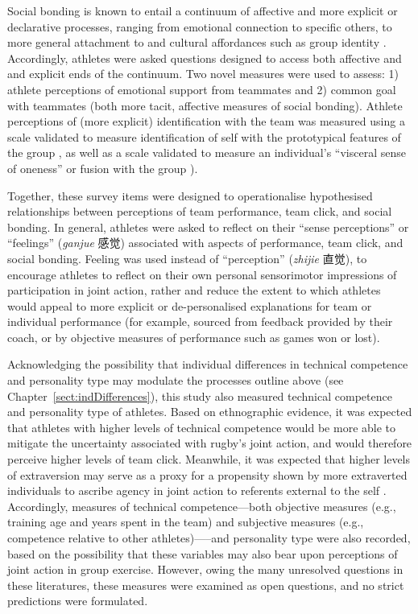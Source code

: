 \begin{CJK}{UTF8}{gbsn}
Social bonding is known to entail a continuum of affective and more explicit or declarative processes, ranging from emotional connection to specific others, to more general attachment to and cultural affordances such as group identity \citep{Dunbar2010,Whitehouse2014}.  Accordingly, athletes were asked questions designed to  access both affective and and explicit ends of the continuum.  Two novel measures were used to assess: 1) athlete perceptions of emotional support from teammates and 2) common goal with teammates (both more tacit, affective measures of social bonding).  Athlete perceptions of (more explicit) identification with the team was measured using a scale validated to measure identification of self with the prototypical features of the group \citep[Group Identification, see][]{Turner1987}, as well as a scale validated to measure an individual's ``visceral sense of oneness'' or fusion with the group \citep[Identity Fusion; see][]{Swann2009}).

Together, these survey items were designed to operationalise hypothesised relationships between perceptions of team performance, team click, and social bonding.  In general, athletes were asked to reflect on their ``sense perceptions'' or ``feelings'' (\textit{ganjue} 感觉) associated with aspects of performance, team click, and social bonding.  Feeling was used instead of ``perception'' (\textit{zhijie} 直觉), to encourage athletes to reflect on their own personal sensorimotor impressions of participation in joint action, rather and reduce the extent to which athletes would appeal to more explicit or de-personalised explanations for team or individual performance (for example, sourced from feedback provided by their coach, or by objective measures of performance such as games won or lost).

Acknowledging the possibility that individual differences in technical competence and personality type may modulate the processes outline above (see Chapter~\ref{sect:indDifferences}), this study also measured technical competence and personality type of athletes.  Based on ethnographic evidence, it was expected that athletes with higher levels of technical competence would be more able to mitigate the uncertainty associated with rugby’s joint action, and would therefore perceive higher levels of team click.  Meanwhile, it was expected that higher levels of extraversion may serve as a proxy for a propensity shown by more extraverted individuals to ascribe agency in joint action to referents external to the self \citep[]{Keller2014}.  Accordingly, measures of technical competence---both objective measures (e.g., training age and years spent in the team) and subjective measures (e.g., competence relative to other athletes)—--and personality type were also recorded, based on the possibility that these variables may also bear upon perceptions of joint action in group exercise.   However, owing the many unresolved questions in these literatures, these measures were examined as open questions, and no strict predictions were formulated.


\end{CJK}

